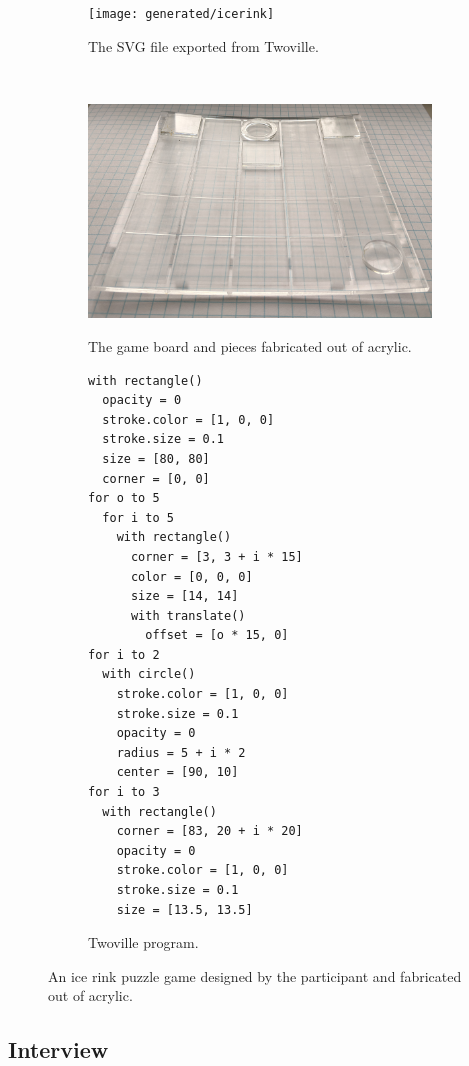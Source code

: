 \begin{figure}
\hfill
\begin{minipage}{0.58\linewidth}%
\begin{subfigure}{\linewidth}%
\begin{minipage}{\linewidth}%
\centering
\texttt{[image: generated/icerink]}%
\end{minipage}
\label{figure:icerink_svg}
\caption{The SVG file exported from Twoville.}
\end{subfigure}%
\vspace{1em}
\\
\begin{subfigure}{\linewidth}
\includegraphics[width=\linewidth]{pixels/icerink-acrylic}%
\label{figure:icerink_photo}
\caption{The game board and pieces fabricated out of acrylic.}
\end{subfigure}%
\end{minipage}%
\hfill
\begin{subfigure}{0.35\linewidth}%
\begin{minipage}{\linewidth}%
\begin{Verbatim}
with rectangle()
  opacity = 0
  stroke.color = [1, 0, 0]
  stroke.size = 0.1
  size = [80, 80]
  corner = [0, 0]
for o to 5
  for i to 5
    with rectangle()
      corner = [3, 3 + i * 15]
      color = [0, 0, 0]
      size = [14, 14]
      with translate()
        offset = [o * 15, 0]
for i to 2  
  with circle()
    stroke.color = [1, 0, 0]
    stroke.size = 0.1
    opacity = 0
    radius = 5 + i * 2
    center = [90, 10]
for i to 3
  with rectangle()
    corner = [83, 20 + i * 20]
    opacity = 0
    stroke.color = [1, 0, 0]
    stroke.size = 0.1
    size = [13.5, 13.5]
\end{Verbatim}
\end{minipage}%
\label{figure:icerink_code}
\caption{Twoville program.}
\end{subfigure}%
\hfill
\caption{An ice rink puzzle game designed by the participant and fabricated out of acrylic.}
\label{figure:icerink}
\end{figure}

\subsection{Interview}
